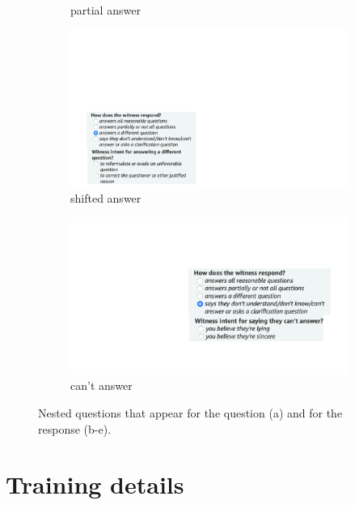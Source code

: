 \begin{figure}
\begin{subfigure}{.34\textwidth}
  \vspace{0.003em}
  \caption{partial answer}
\end{subfigure}%
\begin{subfigure}{.34\textwidth}
  \centering
  \includegraphics[width=1\linewidth]{plots/subj_amt_screenshots_response3.pdf}
  \caption{shifted answer}
\end{subfigure}%
\begin{subfigure}{.34\textwidth}
  \centering
  \includegraphics[width=1\linewidth]{plots/subj_amt_screenshots_response4.pdf}
  \vspace{.481em}
  \caption{can't answer}
\end{subfigure}
\caption{Nested questions that appear for the question (a) and for the response (b-e).}
\label{fig:subj_amt_screenshots_nested}
\end{figure}

\section{Training details}
\label{sec:app_training}

